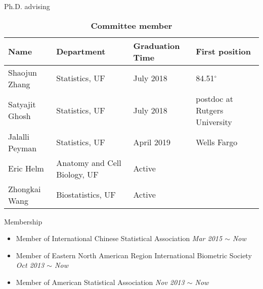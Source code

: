 \documentclass{resume} %
\begin{document}
\begin{rSection}{Ph.D. advising}


\begin{table}[htp]
\caption*{\textbf{Committee member}}
\begin{center}
\begin{tabular}{l l l l}
\hline
\hline
Name & Department & Graduation Time & First position \\
\hline
Shaojun Zhang & Statistics, UF & July 2018 & 84.51$^\circ$ \\
Satyajit Ghosh & Statistics, UF & July 2018 & postdoc at Rutgers University \\
Jalalli Peyman & Statistics, UF & April 2019 & Wells Fargo \\
Eric Helm &  Anatomy and Cell Biology, UF & Active & \\
Zhongkai Wang &  Biostatistics, UF & Active & \\
\hline
\hline
\end{tabular}
\end{center}
\label{default}
\end{table}%

\end{rSection}


\begin{rSection}{Membership}
\begin{itemize}[noitemsep,topsep=0pt]
\item Member of International Chinese Statistical Association
        \hfill {\em Mar 2015 $\sim$ Now} 
\item Member of Eastern North American Region International Biometric Society
        \hfill {\em Oct 2013 $\sim$ Now} 
\item Member of American Statistical Association
        \hfill {\em Nov 2013 $\sim$ Now} 
\end{itemize}
\end{rSection}
\end{document}
